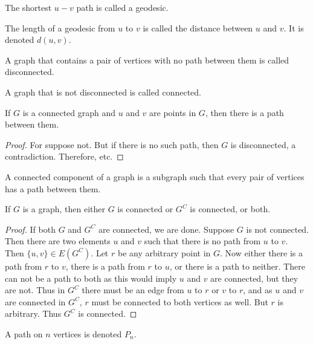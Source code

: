     \begin{definition}
    The shortest $u-v$ path is called a geodesic.
    \end{definition}
    \begin{definition}
    The length of a geodesic from $u$ to $v$ is called the distance between $u$ and $v$. It is denoted $d(u,v)$.
    \end{definition}
    \begin{definition}
    A graph that contains a pair of vertices with no path between them is called disconnected.
    \end{definition}
    \begin{definition}
    A graph that is not disconnected is called connected.
    \end{definition}
    \begin{theorem}
    If $G$ is a connected graph and $u$ and $v$ are points in $G$, then there is a path between them.
    \end{theorem}
    \begin{proof}
    For suppose not. But if there is no such path, then $G$ is disconnected, a contradiction. Therefore, etc.
    \end{proof}
    \begin{definition}
    A connected component of a graph is a subgraph such that every pair of vertices has a path between them.
    \end{definition}
    \begin{theorem}
    If $G$ is a graph, then either $G$ is connected or $G^C$ is connected, or both. 
    \end{theorem}
    \begin{proof}
    If both $G$ and $G^C$ are connected, we are done. Suppose $G$ is not connected. Then there are two elements $u$ and $v$ such that there is no path from $u$ to $v$. Then $\{u,v\}\in E(G^C)$. Let $r$ be any arbitrary point in $G$. Now either there is a path from $r$ to $v$, there is a path from $r$ to $u$, or there is a path to neither. There can not be a path to both as this would imply $u$ and $v$ are connected, but they are not. Thus in $G^C$ there must be an edge from $u$ to $r$ or $v$ to $r$, and as $u$ and $v$ are connected in $G^C$, $r$ must be connected to both vertices as well. But $r$ is arbitrary. Thus $G^C$ is connected.
    \end{proof}
    \begin{definition}
    A path on $n$ vertices is denoted $P_n$.
    \end{definition}

